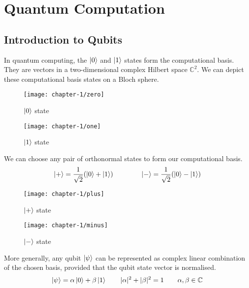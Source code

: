 \section{Quantum Computation}

\begin{comment}
    computational basis states
    bloch spheres
\end{comment}

\subsection{Introduction to Qubits}

In quantum computing, the $\ket 0$ and $\ket 1$ states form the computational basis. They are vectors in a two-dimensional complex Hilbert space $\mathbb{C}^2$. We can depict these computational basis states on a Bloch sphere.
\begin{figure}[H]
\centering
    \begin{minipage}{.4\textwidth}
      \centering
      \texttt{[image: chapter-1/zero]}
      \caption{$\ket 0$ state}
    \end{minipage}%
    \begin{minipage}{.4\textwidth}
      \centering
      \texttt{[image: chapter-1/one]}
      \caption{$\ket 1$ state}
    \end{minipage}
\end{figure}

We can choose any pair of orthonormal states to form our computational basis.
\begin{equation*}
\begin{gathered}
    \ket + = \frac{1}{\sqrt{2}} (\ket 0 + \ket 1) \qquad\qquad
    \ket - = \frac{1}{\sqrt{2}} (\ket 0 - \ket 1)
\end{gathered}
\end{equation*}

\begin{figure}[H]
\centering
    \begin{minipage}{.4\textwidth}
      \centering
      \texttt{[image: chapter-1/plus]}
      \caption{$\ket +$ state}
    \end{minipage}%
    \begin{minipage}{.4\textwidth}
      \centering
      \texttt{[image: chapter-1/minus]}
      \caption{$\ket -$ state}
    \end{minipage}
\end{figure}

More generally, any qubit $\ket\psi$ can be represented as complex linear combination of the chosen basis, provided that the qubit state vector is normalised.
\begin{equation*}
\begin{gathered}
    \ket \psi = \alpha\ket 0 + \beta\ket 1 \qquad
    |\alpha|^2 + |\beta|^2 = 1 \qquad
    \alpha, \beta \in \mathbb{C}
\end{gathered}
\end{equation*}

